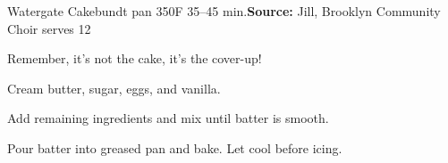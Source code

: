 \begin{recipe}{Watergate Cake}{bundt pan \hfill 350\0F \hfill 35--45 min.}{\textbf{Source:} Jill, Brooklyn Community Choir \hfill serves 12}

 \freeform Remember, it's not the cake, it's the cover-up!

 Cream butter, sugar, eggs, and vanilla.

 Add remaining ingredients and mix until batter is smooth.

 \newstep Pour batter into greased pan and bake. Let cool before icing.
\end{recipe}
